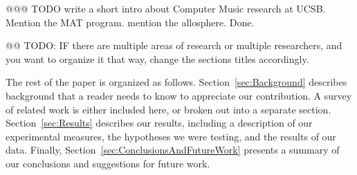 @@@ TODO write a short intro about Computer Music research at UCSB.
Mention the MAT program.  mention the allosphere.  Done.

@@ TODO: IF there are multiple areas of research or multiple researchers, and you want to organize it that way,
change the sections titles accordingly.

The rest of the paper is organized as follows.
Section~\ref{sec:Background} describes background that a reader needs
to know to appreciate our contribution.  A survey of related
work is either included here, or broken out into a separate section.
Section~\ref{sec:Results} describes our results, including a
description of our experimental measures, the hypotheses we were
testing, and the results of our data.  Finally,
Section~\ref{sec:ConclusionsAndFutureWork} presents a summary of our
conclusions and suggestions for future work.

